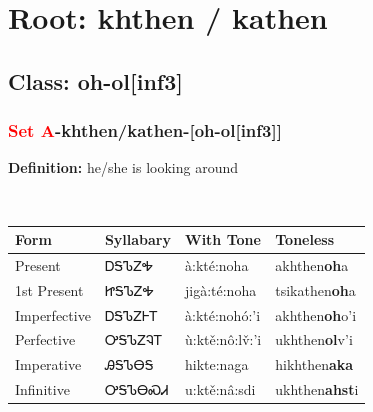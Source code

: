 \needspace{4in}
\section*{Root: khthen / kathen}
\nopagebreak
{}
\needspace{3in}
\subsection*{Class: oh-ol[inf3]}
\nopagebreak
\needspace{2in}
\subsubsection*{\textcolor{Red}{Set A}{-}\textbf{khthen/kathen}{-}[oh-ol[inf3]]}
\nopagebreak
\textbf{Definition: } he/she is looking around
\\[0.5em]
\begin{tabularx}{\textwidth}{l X X X}%
\toprule%
\textbf{Form}&\textbf{Syllabary}&\textbf{With Tone}&\textbf{Toneless}\\%
\midrule%
Present&ᎠᎦᏖᏃᎭ&à:kté:noha&akhthen\textbf{oh}a\\%
1st Present&ᏥᎦᏖᏃᎭ&jigà:té:noha&tsikathen\textbf{oh}a\\%
Imperfective&ᎠᎦᏖᏃᎰᎢ&à:kté:nohó:’i&akhthen\textbf{oh}o'i\\%
Perfective&ᎤᎦᏖᏃᎸᎢ&ù:ktě:nô:lv̌:’i&ukhthen\textbf{ol}v'i\\%
Imperative&ᎯᎦᏖᎾᎦ&hikte:naga&hikhthen\textbf{aka}\\%
Infinitive&ᎤᎦᏖᎾᏍᏗ&u:ktě:nâ:sdi&ukhthen\textbf{ahst}i\\%
\bottomrule%
\end{tabularx}
\\[1em]
